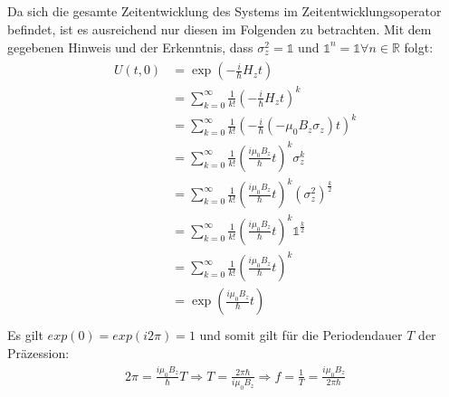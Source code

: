 \documentclass[a4paper,11pt]{article}
\begin{document}
\subsection{}
Da sich die gesamte Zeitentwicklung des Systems im Zeitentwicklungsoperator befindet, ist es ausreichend nur diesen im Folgenden zu betrachten.
Mit dem gegebenen Hinweis und der Erkenntnis, dass $\sigma_z^2 = \mathbb{1}$ und $\mathbb{1}^n = \mathbb{1} \forall n \in \mathbb{R}$ folgt:
\begin{align}
        \begin{split}
                U(t, 0) &= \exp\left(-\frac{i}{\hbar}H_zt\right) \\
                        &= \sum_{k=0}^\infty \frac{1}{k!}\left(-\frac{i}{\hbar} H_zt\right)^k \\
                        &= \sum_{k=0}^\infty \frac{1}{k!}\left(-\frac{i}{\hbar} (-\mu_0B_z\sigma_z)t\right)^k \\
                        &= \sum_{k=0}^\infty \frac{1}{k!}\left(\frac{i\mu_0B_z}{\hbar}t\right)^k \sigma_z^k \\
                        &= \sum_{k=0}^\infty \frac{1}{k!}\left(\frac{i\mu_0B_z}{\hbar}t\right)^k (\sigma_z^2)^\frac{k}{2} \\
                        &= \sum_{k=0}^\infty \frac{1}{k!}\left(\frac{i\mu_0B_z}{\hbar}t\right)^k \mathbb{1}^\frac{k}{2} \\
                        &= \sum_{k=0}^\infty \frac{1}{k!}\left(\frac{i\mu_0B_z}{\hbar}t\right)^k \\
                        &= \exp\left(\frac{i\mu_0B_z}{\hbar}t\right) \\
        \end{split}
\end{align}
Es gilt $exp(0) = exp(i2\pi) = 1$ und somit gilt für die Periodendauer $T$ der Präzession:
\begin{align}
        2\pi = \frac{i\mu_0B_z}{\hbar}T \Rightarrow T = \frac{2\pi\hbar}{i\mu_0B_z} \Rightarrow f = \frac{1}{T} = \frac{i\mu_0B_z}{2\pi\hbar}
\end{align}
\end{document}
